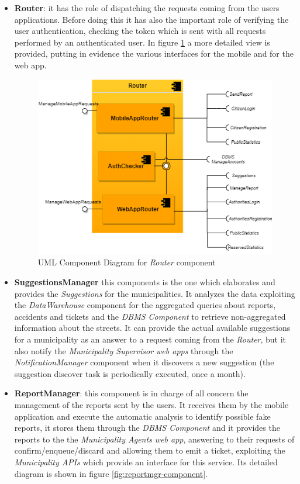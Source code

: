 \documentclass[a4paper]{report}
\begin{document}
\begin{itemize}
\item \textbf{Router}: it has the role of dispatching the requests coming from the users applications. Before doing this it has also the important role of verifying the user authentication, checking the token which is sent with all requests performed by an authenticated user. In figure \ref{fig:router-component} a more detailed view is provided, putting in evidence the various interfaces for the mobile and for the web app.
\begin{figure}[hp]
\includegraphics[width=\textwidth]{Router}
\caption{UML Component Diagram for \textit{Router} component}
\label{fig:router-component}
\end{figure}
\item \textbf{SuggestionsManager} this components is the one which elaborates and provides the \textit{Suggestions} for the municipalities. It analyzes the data exploiting the \textit{DataWarehouse} component for the aggregated queries about reports, accidents and tickets and the \textit{DBMS Component} to retrieve non-aggregated information about the streets. It can provide the actual available suggestions for a municipality as an answer to a request coming from the \textit{Router}, but it also notify the \textit{Municipality Supervisor web apps} through the \textit{NotificationManager} component when it discovers a new suggestion (the suggestion discover task is periodically executed, once a month).
\item \textbf{ReportManager}: this component is in charge of all concern the management of the reports sent by the users. It receives them by the mobile application and execute the automatic analysis to identify possible fake reports, it stores them through the \textit{DBMS Component} and it provides the reports to the the \textit{Municipality Agents web app}, answering to their requests of confirm/enqueue/discard and allowing them to emit a ticket, exploiting the \textit{Municipality APIs} which provide an interface for this service. Its detailed diagram is shown in figure \ref{fig:reportmgr-component}.


\end{itemize}
\end{document}
